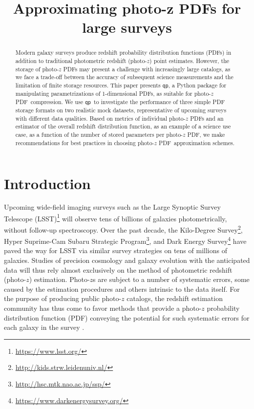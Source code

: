 \documentclass[\docopts]{\docclass}
\newcommand{\qp}{\texttt{qp}}
\newcommand{\pz}{photo-$z$ PDF}
\begin{document}
\linenumbers

\title{ Approximating photo-z PDFs for large surveys }


\begin{abstract}

Modern galaxy surveys produce redshift probability distribution functions 
(PDFs) in addition to traditional photometric redshift (photo-$z$) point 
estimates.
However, the storage of \pz s may present a challenge with increasingly large 
catalogs, as we face a trade-off between the accuracy of subsequent science 
measurements and the limitation of finite storage resources.
This paper presents \qp, a Python package for manipulating parametrizations of 
1-dimensional PDFs, as suitable for \pz\ compression.
We use \qp\ to investigate the performance of three simple PDF storage formats 
on two realistic mock datasets, representative of upcoming surveys with 
different data qualities.
Based on metrics of individual \pz s and an estimator of the overall redshift 
distribution function, as an example of a science use case, as a function of 
the number of stored parameters per \pz, we make recommendations for best 
practices in choosing \pz\ approximation schemes.

\end{abstract}


\maketitlepost


\section{Introduction}
\label{sec:intro}


Upcoming wide-field imaging surveys such as the Large Synoptic Survey Telescope 
(LSST)\footnote{\url{https://www.lsst.org/}}\citep{ivezic_lsst:_2008} will 
observe tens of billions of galaxies photometrically, without follow-up 
spectroscopy.
Over the past decade, the Kilo-Degree 
Survey\footnote{\url{http://kids.strw.leidenuniv.nl/}}, Hyper Suprime-Cam 
Subaru Strategic Program\footnote{\url{http://hsc.mtk.nao.ac.jp/ssp/}}, and 
Dark Energy Survey\footnote{\url{https://www.darkenergysurvey.org/}} have paved 
the way for LSST via similar survey strategies on tens of millions of galaxies.
Studies of precision cosmology and galaxy evolution with the anticipated data 
will thus rely almost exclusively on the method of photometric redshift 
(photo-$z$) estimation.
Photo-$z$s are subject to a number of systematic errors, some caused by the 
estimation procedures and others intrinsic to the data itself.
For the purpose of producing public photo-$z$ catalogs, the redshift estimation 
community has thus come to favor methods that provide a photo-$z$ probability 
distribution function (PDF) conveying the potential for such systematic errors 
for each galaxy in the survey \citep{tanaka_photometric_2017, jong_third_2017, 
sheldon_photometric_2012}.
\end{document}
